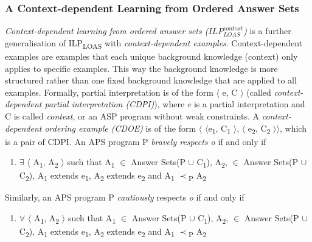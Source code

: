 \documentclass[12pt,twoside]{report}
\begin{document}
\subsubsection{A Context-dependent Learning from Ordered Answer Sets }
\textit{Context-dependent learning from ordered answer sets ($ILP_{LOAS}^{context}$)} is a further generalisation of ILP\textsubscript{LOAS} with \textit{context-dependent examples}.
Context-dependent examples are examples that each unique background knowledge (context) only applies to specific examples. This way the background knowledge is more structured rather than one fixed background knowledge that are applied to all examples.
Formally, partial interpretation is of the form $\langle$ e, C $\rangle$ (called \textit{context-dependent partial interpretation (CDPI)}), where \textit{e} is a partial interpretation and C is called \textit{context}, or an ASP program without weak constraints.
A \textit{context-dependent ordering example (CDOE)} is of the form $\langle$ $\langle$e\textsubscript{1}, C\textsubscript{1} $\rangle$, $\langle$ e\textsubscript{2}, C\textsubscript{2} $\rangle$$\rangle$, which is a pair of CDPI. An APS program P \textit{bravely respects o} if and only if
\begin{enumerate}
 \item $\exists$ $\langle$ A\textsubscript{1}, A\textsubscript{2} $\rangle$ such that A\textsubscript{1} $\in$ Answer Sets(P $\cup$ C\textsubscript{1}),  A\textsubscript{2}, $\in$ Answer Sets(P $\cup$ C\textsubscript{2}), A\textsubscript{1} extends e\textsubscript{1}, A\textsubscript{2} extends e\textsubscript{2} and A\textsubscript{1} $\prec$\textsubscript{P} A\textsubscript{2}
\end{enumerate}

 Similarly, an APS program P \textit{cautiously} respects \textit{o} if and only if
\begin{enumerate}
 \item $\forall$ $\langle$ A\textsubscript{1}, A\textsubscript{2} $\rangle$ such that A\textsubscript{1} $\in$ Answer Sets(P $\cup$ C\textsubscript{1}),  A\textsubscript{2}, $\in$ Answer Sets(P $\cup$ C\textsubscript{2}), A\textsubscript{1} extends e\textsubscript{1}, A\textsubscript{2} extends e\textsubscript{2} and A\textsubscript{1} $\prec$\textsubscript{P} A\textsubscript{2}
\end{enumerate}
\end{document}
